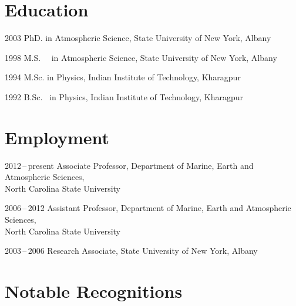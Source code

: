 \section*{Education}

\begin{tlist}

\item[2003] PhD. in Atmospheric Science, State University of New York, Albany

\item[1998] M.S. ~~in Atmospheric Science, State University of New York, Albany

\item[1994] M.Sc. in Physics, Indian Institute of Technology, Kharagpur

\item[1992] B.Sc. ~in Physics, Indian Institute of Technology, Kharagpur

\end{tlist}

\section*{Employment}

\begin{tlist}
\item[2012\,--\,present] Associate Professor, Department of Marine, Earth and Atmospheric Sciences, \\ North Carolina State University


\item[2006\,--\,2012] Assistant Professor, Department of Marine, Earth and Atmospheric Sciences, \\ North Carolina State University

\item[2003\,--\,2006] Research Associate, State University of New York, Albany
 
\end{tlist}


\section*{Notable Recognitions}

